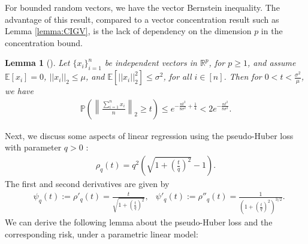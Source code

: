 \documentclass{article}
\newtheorem{lemma}{Lemma}
\begin{document}
For bounded random vectors, we have the vector Bernstein inequality. The advantage of this result, compared to a vector concentration result such as Lemma \ref{lemma:CIGV}, is the lack of dependency on the dimension $p$ in the concentration bound.

\begin{lemma}[\cite{Vect_Bern}]
\label{lemma:Bern_Vec}
Let $\{x_i\}_{i = 1}^n$ be independent vectors in $\mathbb{R}^p$, for $p \geq 1$, and assume $\mathbb{E}[x_i] = 0$, $||x_i||_2 \leq \mu$, and $\mathbb{E}\left[||x_i||_2^2\right] \leq \sigma^2$, for all $i \in [n]$. Then for $0 < t < \frac{\sigma^2}{\mu}$, we have
\begin{align*}
\mathbb{P}\left(\left\|\frac{\sum_{i = 1}^nx_i}{n}\right\|_2 \geq t\right) \leq e^{-\frac{nt^2}{8\sigma^2} + \frac{1}{4}} < 2e^{-\frac{nt^2}{8\sigma^2}}.
\end{align*}
\end{lemma}

Next, we discuss some aspects of linear regression using the pseudo-Huber loss with parameter $q > 0$ \cite{PSHUBER_BARRON}:
\begin{align*}
\rho_q(t) = q^2\left(\sqrt{1 + \left(\frac{t}{q}\right)^2} - 1\right).
\end{align*}
The first and second derivatives are given by
\begin{align*}
&\psi_q(t) := \rho'_q(t) = \frac{t}{\sqrt{1 + \left(\frac{t}{q}\right)^2}}, 
&\psi'_q(t) := \rho''_q(t) = \frac{1}{\left(1 + \left(\frac{t}{q}\right)^2\right)^{3/2}}.
\end{align*}
We can derive the following lemma about the pseudo-Huber loss and the corresponding risk, under a parametric linear model:
\end{document}
